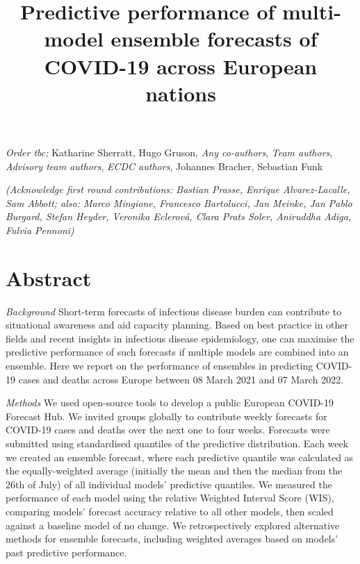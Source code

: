 \documentclass[
]{article}
\title{Predictive performance of multi-model ensemble forecasts of
COVID-19 across European nations}
\author{}
\date{\vspace{-2.5em}}
\begin{document}
\maketitle

\emph{Order tbc;} Katharine Sherratt, Hugo Gruson, \emph{Any
co-authors}, \emph{Team authors}, \emph{Advisory team authors},
\emph{ECDC authors}, Johannes Bracher, Sebastian Funk

\emph{(Acknowledge first round contributions: Bastian Prasse, Enrique
Alvarez-Lacalle, Sam Abbott; also: Marco Mingione, Francesco Bartolucci,
Jan Meinke, Jan Pablo Burgard, Stefan Heyder, Veronika Eclerová, Clara
Prats Soler, Aniruddha Adiga, Fulvia Pennoni)}

\hypertarget{abstract}{%
\section{Abstract}\label{abstract}}

\emph{Background} Short-term forecasts of infectious disease burden can
contribute to situational awareness and aid capacity planning. Based on
best practice in other fields and recent insights in infectious disease
epidemiology, one can maximise the predictive performance of such
forecasts if multiple models are combined into an ensemble. Here we
report on the performance of ensembles in predicting COVID-19 cases and
deaths across Europe between 08 March 2021 and 07 March 2022.

\emph{Methods} We used open-source tools to develop a public European
COVID-19 Forecast Hub. We invited groups globally to contribute weekly
forecasts for COVID-19 cases and deaths over the next one to four weeks.
Forecasts were submitted using standardised quantiles of the predictive
distribution. Each week we created an ensemble forecast, where each
predictive quantile was calculated as the equally-weighted average
(initially the mean and then the median from the 26th of July) of all
individual models' predictive quantiles. We measured the performance of
each model using the relative Weighted Interval Score (WIS), comparing
models' forecast accuracy relative to all other models, then scaled
against a baseline model of no change. We retrospectively explored
alternative methods for ensemble forecasts, including weighted averages
based on models' past predictive performance.
\end{document}
